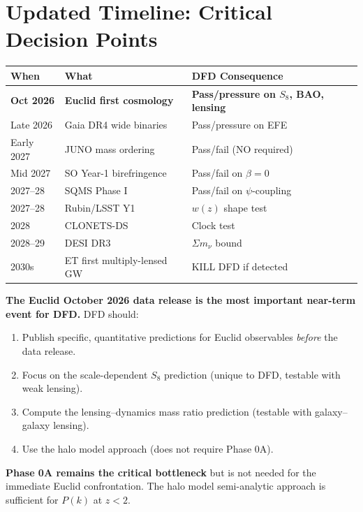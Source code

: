 \documentclass[11pt,a4paper]{article}
\begin{document}
\section{Updated Timeline: Critical Decision Points}

\begin{center}
\begin{longtable}{lll}
\toprule
\textbf{When} & \textbf{What} & \textbf{DFD Consequence} \\
\midrule
\textbf{Oct 2026} & \textbf{Euclid first cosmology} & \textbf{Pass/pressure on $S_8$, BAO, lensing} \\
Late 2026 & Gaia DR4 wide binaries & Pass/pressure on EFE \\
Early 2027 & JUNO mass ordering & Pass/fail (NO required) \\
Mid 2027 & SO Year-1 birefringence & Pass/fail on $\beta = 0$ \\
2027--28 & SQMS Phase I & Pass/fail on $\psi$-coupling \\
2027--28 & Rubin/LSST Y1 & $w(z)$ shape test \\
2028 & CLONETS-DS & Clock test \\
2028--29 & DESI DR3 & $\Sigma m_\nu$ bound \\
2030s & ET first multiply-lensed GW & KILL DFD if detected \\
\bottomrule
\end{longtable}
\end{center}

\begin{tcolorbox}[colback=blue!5!white, colframe=blue!60!black, title={Agent 17: Strategic Recommendation}]
\textbf{The Euclid October 2026 data release is the most important near-term event for DFD.} DFD should:
\begin{enumerate}
\item Publish specific, quantitative predictions for Euclid observables \emph{before} the data release.
\item Focus on the scale-dependent $S_8$ prediction (unique to DFD, testable with weak lensing).
\item Compute the lensing--dynamics mass ratio prediction (testable with galaxy--galaxy lensing).
\item Use the halo model approach (does not require Phase 0A).
\end{enumerate}

\textbf{Phase 0A remains the critical bottleneck} but is not needed for the immediate Euclid confrontation. The halo model semi-analytic approach is sufficient for $P(k)$ at $z < 2$.
\end{tcolorbox}
\end{document}
